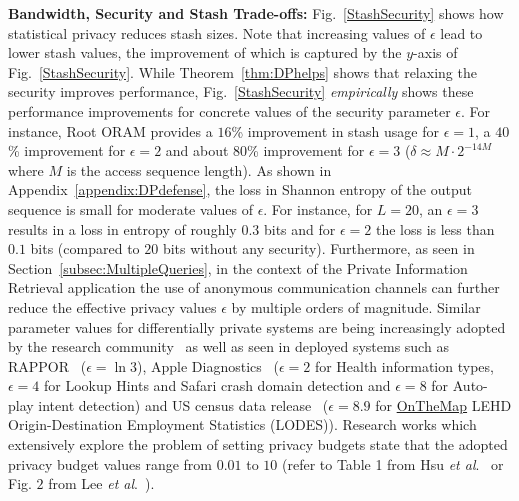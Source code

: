 \documentclass[USenglish,oneside,twocolumn]{article}
\newcommand{\ourprotocol}{Root ORAM}
\newcommand{\etal}{\textit{et al}.}
\begin{document}
\textbf{Bandwidth, Security and Stash Trade-offs: }Fig.~\ref{StashSecurity} shows how statistical privacy reduces stash sizes. Note that increasing values of $\epsilon$ lead to lower stash values, the improvement of which is captured by the $y$-axis of Fig.~\ref{StashSecurity}. While Theorem~\ref{thm:DPhelps} shows that relaxing the security improves performance, Fig.~\ref{StashSecurity} \textit{empirically} shows these performance improvements for concrete values of the security parameter $\epsilon$. 
For instance, \ourprotocol{} provides a $16$\% improvement in stash usage for $\epsilon = 1$, a $40$\% improvement for $\epsilon = 2$ and about $80$\% improvement for $\epsilon = 3$ ($\delta \approx M \cdot  2^{-14M}$ where $M$ is the access sequence length). 
As shown in Appendix~\ref{appendix:DPdefense}, the loss in Shannon entropy of the output sequence is small for moderate values of $\epsilon$. For instance, for $L=20$, an $\epsilon = 3$ results in a loss in entropy of roughly $0.3$ bits and for $\epsilon = 2$ the loss is less than $0.1$ bits (compared to $20$ bits without any security).
Furthermore, as seen in Section~\ref{subsec:MultipleQueries}, in the context of the Private Information Retrieval application the use of anonymous communication channels can further reduce the effective privacy values $\epsilon$ by multiple orders of magnitude.
Similar parameter values for differentially private systems are being increasingly adopted by the research community~\cite{goldbergDPPIR} as well as seen in deployed systems such as RAPPOR~\cite{rappor} ($\epsilon = \ln 3$), Apple Diagnostics~\cite{appleDP, appleDPepsilon} ($\epsilon = 2$ for Health information types, $\epsilon = 4$ for Lookup Hints and Safari crash domain detection and $\epsilon = 8$ for Auto-play intent detection) and US census data release~\cite{UScensusJohn, UScensusDP, UScensusDPharvard} ($\epsilon = 8.9$ for \href{http://onthemap.ces.census.gov/}{OnTheMap} LEHD Origin-Destination Employment Statistics (LODES)). Research works which extensively explore the problem of setting privacy budgets state that the adopted privacy budget values range from $0.01$ to $10$ (refer to Table 1 from Hsu \etal~\cite{hsu2014differential} or Fig. $2$ from Lee \etal~\cite{lee2011much}).
\end{document}
